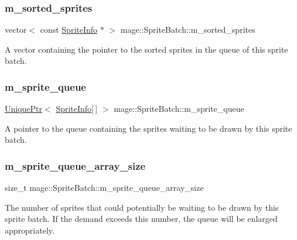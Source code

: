 \subsubsection{\texorpdfstring{m\+\_\+sorted\+\_\+sprites}{m\_sorted\_sprites}}
{\footnotesize\ttfamily vector$<$ const \hyperlink{structmage_1_1_sprite_info}{Sprite\+Info} $\ast$ $>$ mage\+::\+Sprite\+Batch\+::m\+\_\+sorted\+\_\+sprites\hspace{0.3cm}{\ttfamily [private]}}

A vector containing the pointer to the sorted sprites in the queue of this sprite batch. \hypertarget{classmage_1_1_sprite_batch_a67ab116e403b626771f03f527efa6f2f}{}\label{classmage_1_1_sprite_batch_a67ab116e403b626771f03f527efa6f2f} 
\subsubsection{\texorpdfstring{m\+\_\+sprite\+\_\+queue}{m\_sprite\_queue}}
{\footnotesize\ttfamily \hyperlink{namespacemage_a3316d7143a973e37adf1110f2e80ca31}{Unique\+Ptr}$<$ \hyperlink{structmage_1_1_sprite_info}{Sprite\+Info}\mbox{[}$\,$\mbox{]} $>$ mage\+::\+Sprite\+Batch\+::m\+\_\+sprite\+\_\+queue\hspace{0.3cm}{\ttfamily [private]}}

A pointer to the queue containing the sprites waiting to be drawn by this sprite batch. \hypertarget{classmage_1_1_sprite_batch_a207760f2e11b1ea199529c65c9b21b3b}{}\label{classmage_1_1_sprite_batch_a207760f2e11b1ea199529c65c9b21b3b} 
\subsubsection{\texorpdfstring{m\+\_\+sprite\+\_\+queue\+\_\+array\+\_\+size}{m\_sprite\_queue\_array\_size}}
{\footnotesize\ttfamily size\+\_\+t mage\+::\+Sprite\+Batch\+::m\+\_\+sprite\+\_\+queue\+\_\+array\+\_\+size\hspace{0.3cm}{\ttfamily [private]}}

The number of sprites that could potentially be waiting to be drawn by this sprite batch. If the demand exceeds this number, the queue will be enlarged appropriately. \hypertarget{classmage_1_1_sprite_batch_a0d7dadf01e3b905072c1aaa6b8e42c0e}{}\label{classmage_1_1_sprite_batch_a0d7dadf01e3b905072c1aaa6b8e42c0e} 
